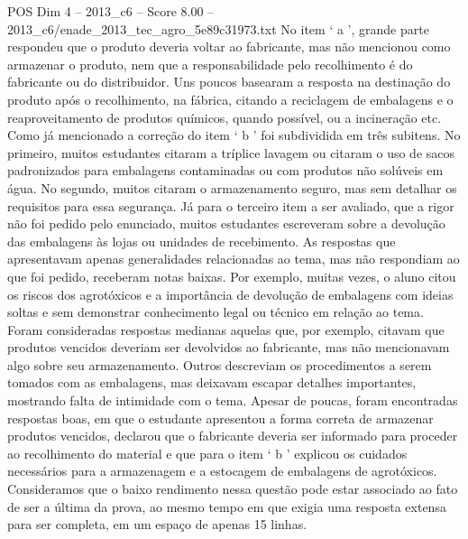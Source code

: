 \begin{textsample}{POS Dim 4 – 2013\_c6 – Score 8.00 – 2013\_c6/enade\_2013\_tec\_agro\_5e89c31973.txt}
No item ‘ a ’, grande parte respondeu que o produto deveria voltar ao fabricante, mas não mencionou como armazenar o produto, nem que a responsabilidade pelo recolhimento é do fabricante ou do distribuidor.
Uns poucos basearam a resposta na destinação do produto após o recolhimento, na fábrica, citando a reciclagem de embalagens e o reaproveitamento de produtos químicos, quando possível, ou a incineração etc.
Como já mencionado a correção do item ‘ b ’ foi subdividida em três subitens.
No primeiro, muitos estudantes citaram a tríplice lavagem ou citaram o uso de sacos padronizados para embalagens contaminadas ou com produtos não solúveis em água.
No segundo, muitos citaram o armazenamento seguro, mas sem detalhar os requisitos para essa segurança.
Já para o terceiro item a ser avaliado, que a rigor não foi pedido pelo enunciado, muitos estudantes escreveram sobre a devolução das embalagens às lojas ou unidades de recebimento.
As respostas que apresentavam apenas generalidades relacionadas ao tema, mas não respondiam ao que foi pedido, receberam notas baixas.
Por exemplo, muitas vezes, o aluno citou os riscos dos agrotóxicos e a importância de devolução de embalagens com ideias soltas e sem demonstrar conhecimento legal ou técnico em relação ao tema.
Foram consideradas respostas medianas aquelas que, por exemplo, citavam que produtos vencidos deveriam ser devolvidos ao fabricante, mas não mencionavam algo sobre seu armazenamento.
Outros descreviam os procedimentos a serem tomados com as embalagens, mas deixavam escapar detalhes importantes, mostrando falta de intimidade com o tema.
Apesar de poucas, foram encontradas respostas boas, em que o estudante apresentou a forma correta de armazenar produtos vencidos, declarou que o fabricante deveria ser informado para proceder ao recolhimento do material e que para o item ‘ b ’ explicou os cuidados necessários para a armazenagem e a estocagem de embalagens de agrotóxicos.
Consideramos que o baixo rendimento nessa questão pode estar associado ao fato de ser a última da prova, ao mesmo tempo em que exigia uma resposta extensa para ser completa, em um espaço de apenas 15 linhas.

\end{textsample}
